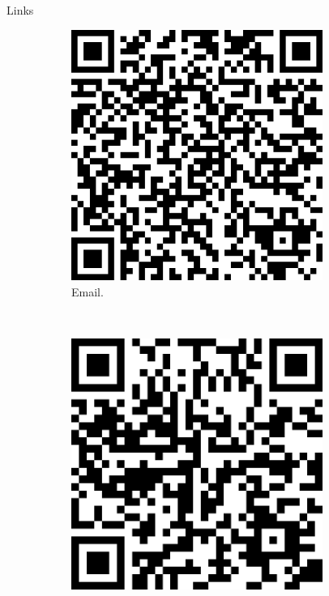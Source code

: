 \documentclass[20pt]{beamer}
\begin{document}
\begin{frame}[fragile,t]
\begin{columns}[t]
\begin{column}{0.33\linewidth}
\begin{block}{Links}
\vspace{0.5cm}    
\begin{figure}
    \begin{subfigure}[b]{0.2\textwidth}
\centering
\includegraphics[width=0.90\textwidth]{fig_poster/qrcode_email_alber_ipia_at_inpe.png}\\
{Email.}
    \end{subfigure}
    ~
    \begin{subfigure}[b]{0.2\textwidth}
\centering
\includegraphics[width=0.90\textwidth]{fig_poster/qrcode_link_github_prioritizing.png}\\

\end{subfigure}
\end{figure}
\end{block}
\end{column}
\end{columns}
\end{frame}
\end{document}
